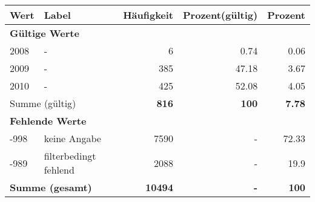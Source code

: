      \begin{longtable}{lXrrr}
     \toprule
     \textbf{Wert} & \textbf{Label} & \textbf{Häufigkeit} & \textbf{Prozent(gültig)} & \textbf{Prozent} \\
     \endhead
     \midrule
     \multicolumn{5}{l}{\textbf{Gültige Werte}}\\

     2008 &
     \multicolumn{1}{X}{ -  } &


       \num{6} &
       \num[round-mode=places,round-precision=2]{0.74} &
         \num[round-mode=places,round-precision=2]{0.06} \\

     2009 &
     \multicolumn{1}{X}{ -  } &


       \num{385} &
       \num[round-mode=places,round-precision=2]{47.18} &
         \num[round-mode=places,round-precision=2]{3.67} \\

     2010 &
     \multicolumn{1}{X}{ -  } &


       \num{425} &
       \num[round-mode=places,round-precision=2]{52.08} &
         \num[round-mode=places,round-precision=2]{4.05} \\
     \midrule
     \multicolumn{2}{l}{Summe (gültig)} &
       \textbf{\num{816}} &
     \textbf{\num{100}} &
       \textbf{\num[round-mode=places,round-precision=2]{7.78}} \\
     \multicolumn{5}{l}{\textbf{Fehlende Werte}}\\
       -998 &
       keine Angabe &
         \num{7590} &
        - &
         \num[round-mode=places,round-precision=2]{72.33} \\
       -989 &
       filterbedingt fehlend &
         \num{2088} &
        - &
         \num[round-mode=places,round-precision=2]{19.9} \\
     \midrule
     \multicolumn{2}{l}{\textbf{Summe (gesamt)}} &
          \textbf{\num{10494}} &
        \textbf{-} &
        \textbf{\num{100}} \\
     \bottomrule
     \end{longtable}
     
